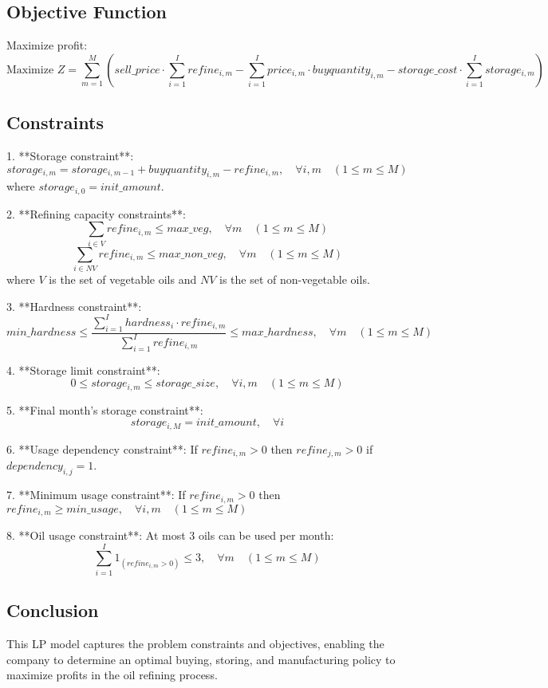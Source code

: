 \documentclass{article}
\begin{document}
\subsection*{Objective Function}
Maximize profit:
\[
\text{Maximize } Z = \sum_{m=1}^{M} \left( sell\_price \cdot \sum_{i=1}^{I} refine_{i,m} - \sum_{i=1}^{I} price_{i,m} \cdot buyquantity_{i,m} - storage\_cost \cdot \sum_{i=1}^{I} storage_{i,m} \right)
\]

\subsection*{Constraints}
1. **Storage constraint**:
\[
storage_{i,m} = storage_{i,m-1} + buyquantity_{i,m} - refine_{i,m}, \quad \forall i, m \quad (1 \leq m \leq M)
\]
where \(storage_{i,0} = init\_amount\).

2. **Refining capacity constraints**:
\[
\sum_{i \in V} refine_{i,m} \leq max\_veg, \quad \forall m \quad (1 \leq m \leq M)
\]
\[
\sum_{i \in NV} refine_{i,m} \leq max\_non\_veg, \quad \forall m \quad (1 \leq m \leq M)
\]
where \(V\) is the set of vegetable oils and \(NV\) is the set of non-vegetable oils.

3. **Hardness constraint**:
\[
min\_hardness \leq \frac{\sum_{i=1}^{I} hardness_{i} \cdot refine_{i,m}}{\sum_{i=1}^{I} refine_{i,m}} \leq max\_hardness, \quad \forall m \quad (1 \leq m \leq M)
\]

4. **Storage limit constraint**:
\[
0 \leq storage_{i,m} \leq storage\_size, \quad \forall i, m \quad (1 \leq m \leq M)
\]

5. **Final month's storage constraint**:
\[
storage_{i,M} = init\_amount, \quad \forall i
\]

6. **Usage dependency constraint**:
If \(refine_{i,m} > 0\) then \(refine_{j,m} > 0\) if \(dependency_{i,j} = 1\).

7. **Minimum usage constraint**:
If \(refine_{i,m} > 0\) then \(refine_{i,m} \geq min\_usage, \quad \forall i, m \quad (1 \leq m \leq M)\)

8. **Oil usage constraint**:
At most 3 oils can be used per month:
\[
\sum_{i=1}^{I} \text{1}_{(refine_{i,m} > 0)} \leq 3, \quad \forall m \quad (1 \leq m \leq M)
\]

\subsection*{Conclusion}
This LP model captures the problem constraints and objectives, enabling the company to determine an optimal buying, storing, and manufacturing policy to maximize profits in the oil refining process.
\end{document}
